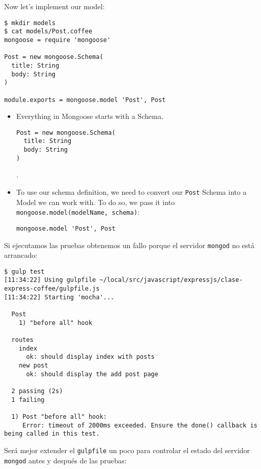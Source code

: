 Now let’s implement our model:
\begin{verbatim}
$ mkdir models
$ cat models/Post.coffee 
mongoose = require 'mongoose'

Post = new mongoose.Schema(
  title: String
  body: String
)

module.exports = mongoose.model 'Post', Post
\end{verbatim}

\begin{itemize}
\item
Everything in Mongoose starts with a Schema. 
\begin{verbatim}
Post = new mongoose.Schema(
  title: String
  body: String
)
\end{verbatim}
.
\item
To use our schema definition, we need to convert our \verb|Post| Schema
into a Model we can work with. To do so, we pass it into
\verb|mongoose.model(modelName, schema)|:
\begin{verbatim}
mongoose.model 'Post', Post
\end{verbatim}
\end{itemize}
Si ejecutamos las pruebas obtenemos un fallo porque el servidor \verb|mongod| no está arrancado:
\begin{verbatim}
$ gulp test
[11:34:22] Using gulpfile ~/local/src/javascript/expressjs/clase-express-coffee/gulpfile.js
[11:34:22] Starting 'mocha'...

  Post
    1) "before all" hook

  routes
    index
      ok: should display index with posts
    new post
      ok: should display the add post page

  2 passing (2s)
  1 failing

  1) Post "before all" hook:
     Error: timeout of 2000ms exceeded. Ensure the done() callback is being called in this test.
\end{verbatim}
Será mejor extender el \verb|gulpfile|
un poco para controlar el estado del servidor
\verb|mongod| antes y después de las 
pruebas:
